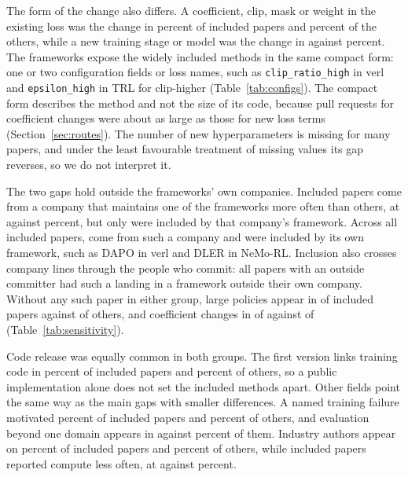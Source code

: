 \documentclass{article}
\begin{document}
The form of the change also differs. A coefficient, clip, mask or weight in the existing loss was the change in \CCCoefCasePct{} percent of included papers and \CCCoefCtrlPct{} percent of the others, while a new training stage or model was the change in \CCPipelineCasePct{} against \CCPipelineCtrlPct{} percent. The frameworks expose the widely included methods in the same compact form: one or two configuration fields or loss names, such as \texttt{clip\_ratio\_high} in verl and \texttt{epsilon\_high} in TRL for clip-higher (Table~\ref{tab:configs}). The compact form describes the method and not the size of its code, because pull requests for coefficient changes were about as large as those for new loss terms (Section~\ref{sec:routes}). The number of new hyperparameters is missing for many papers, and under the least favourable treatment of missing values its gap reverses, so we do not interpret it.

The two gaps hold outside the frameworks' own companies. Included papers come from a company that maintains one of the frameworks more often than others, at \CCOrgCasePct{} against \CCOrgCtrlPct{} percent, but only \CCOwnCase{} were included by that company's framework. Across all \NAdopted{} included papers, \NOrgIncluded{} come from such a company and \NOwnIncluded{} were included by its own framework, such as DAPO in verl and DLER in NeMo-RL. Inclusion also crosses company lines through the people who commit: all \NIndependent{} papers with an outside committer had such a landing in a framework outside their own company. Without any such paper in either group, large policies appear in \CCNoOrgBigThirtyCase{} of \CCNoOrgBigThirtyCaseN{} included papers against \CCNoOrgBigThirtyCtrl{} of \CCNoOrgBigThirtyCtrlN{} others, and coefficient changes in \CCNoOrgCoefCase{} of \CCNoOrgCoefCaseN{} against \CCNoOrgCoefCtrl{} of \CCNoOrgCoefCtrlN{} (Table~\ref{tab:sensitivity}).

Code release was equally common in both groups. The first version links training code in \CCCodeCasePct{} percent of included papers and \CCCodeCtrlPct{} percent of others, so a public implementation alone does not set the included methods apart. Other fields point the same way as the main gaps with smaller differences. A named training failure motivated \CCFailureCasePct{} percent of included papers and \CCFailureCtrlPct{} percent of others, and evaluation beyond one domain appears in \CCBroadCasePct{} against \CCBroadCtrlPct{} percent of them. Industry authors appear on \CCIndustryAnyCasePct{} percent of included papers and \CCIndustryAnyCtrlPct{} percent of others, while included papers reported compute less often, at \CCComputeCasePct{} against \CCComputeCtrlPct{} percent.
\end{document}

